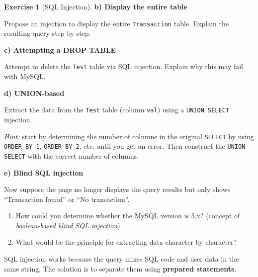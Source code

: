 \documentclass[a4paper,11pt]{article}
\theoremstyle{plain}
\theoremstyle{definition}
\newtheorem{exercice}{Exercise}
\begin{document}
\begin{exercice}[SQL Injection]
\medskip

\textbf{b) Display the entire table}

\medskip

Propose an injection to display the entire \texttt{Transaction} table. Explain the resulting query step by step.

\medskip

\textbf{c) Attempting a DROP TABLE}

\medskip

Attempt to delete the \texttt{Test} table via SQL injection. Explain why this may fail with MySQL.

\medskip

\textbf{d) UNION-based}

\medskip

Extract the data from the \texttt{Test} table (column \texttt{val}) using a \texttt{UNION SELECT} injection.

\textit{Hint:} start by determining the number of columns in the original \texttt{SELECT} by using \texttt{ORDER BY 1}, \texttt{ORDER BY 2}, etc. until you get an error. Then construct the \texttt{UNION SELECT} with the correct number of columns.

\medskip

\textbf{e) Blind SQL injection}

\medskip

Now suppose the page no longer displays the query results but only shows ``Transaction found'' or ``No transaction''.

\begin{enumerate}
    \item How could you determine whether the MySQL version is 5.x? (concept of \textit{boolean-based blind SQL injection})
    \item What would be the principle for extracting data character by character?
\end{enumerate}

\begin{pointcle}
SQL injection works because the query mixes SQL code and user data in the same string. The solution is to separate them using \textbf{prepared statements}.
\end{pointcle}

\end{exercice}


\end{document}
